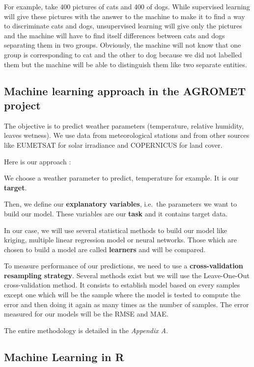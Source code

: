 \documentclass[12pt,twoside]{reedthesis}
\theoremstyle{definition}
\theoremstyle{definition}
\theoremstyle{definition}
\theoremstyle{remark}
\begin{document}
For example, take 400 pictures of cats and 400 of dogs. While supervised
learning will give these pictures with the answer to the machine to make
it to find a way to discriminate cats and dogs, unsupervised learning
will give only the pictures and the machine will have to find itself
differences between cats and dogs separating them in two groups.
Obviously, the machine will not know that one group is corresponding to
cat and the other to dog because we did not labelled them but the
machine will be able to distinguish them like two separate entities.

\subsection{Machine learning approach in the AGROMET
project}\label{machine-learning-approach-in-the-agromet-project}

The objective is to predict weather parameters (temperature, relative
humidity, leaves wetness). We use data from meteorological stations and
from other sources like EUMETSAT for solar irradiance and COPERNICUS for
land cover.

Here is our approach :

We choose a weather parameter to predict, temperature for example. It is
our \textbf{target}.

Then, we define our \textbf{explanatory variables}, i.e.~the parameters
we want to build our model. These variables are our \textbf{task} and it
contains target data.

In our case, we will use several statistical methods to build our model
like kriging, multiple linear regression model or neural networks. Those
which are chosen to build a model are called \textbf{learners} and will
be compared.

To measure performance of our predictions, we need to use a
\textbf{cross-validation resampling strategy}. Several methods exist but
we will use the Leave-One-Out cross-validation method. It consists to
establish model based on every samples except one which will be the
sample where the model is tested to compute the error and then doing it
again as many times as the number of samples. The error measured for our
models will be the RMSE and MAE.

The entire methodology is detailed in the \emph{Appendix A}.

\subsection{Machine Learning in R}\label{machine-learning-in-r}
\end{document}
